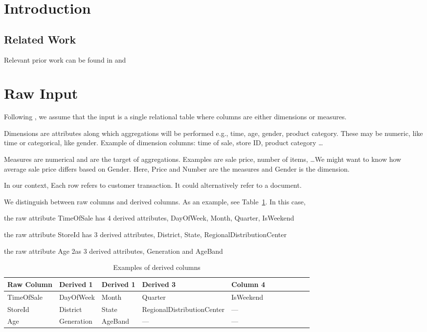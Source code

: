 
\section{Introduction}

\subsection{Related Work}
Relevant prior work can be found in \cite{sarawagi99}
and \cite{Fagin05}
\section{Raw Input}
Following \cite{Fagin05}, we assume that the input is a 
single relational table where columns are either dimensions or measures. 

Dimensions are
attributes along which aggregations will be performed e.g., time, age,
gender, product category. These may be numeric, like time or
categorical, like gender.
Example of dimension columns: time of sale, store ID, product category \ldots

Measures are numerical and are the target of aggregations. Examples are sale
price, number of items, \ldots We might want to know how average sale price
differs based on Gender. Here, Price and Number are the measures and Gender is
the dimension.

In our context, Each row refers to customer transaction. It could alternatively
refer to a document. 

We distinguish between raw columns and derived columns. As an example, see
Table~\ref{derived_columns}. In this case, 
\be
\item the raw attribute TimeOfSale
has 4 derived attributes, DayOfWeek, Month, Quarter, IsWeekend
\item the raw attribute StoreId
has 3 derived attributes, District, State, RegionalDistributionCenter
\item the raw attribute Age
2as 3 derived attributes, Generation and AgeBand
\item 
\ee

\begin{table}[hbtp]
\centering
\begin{tabular}{|l|l|l|l|l|l|l|l|l|l|l|} \hline \hline
Raw Column & Derived 1 & Derived 1 & Derived 3 & Column 4 \\ \hline
\hline
TimeOfSale & DayOfWeek & Month & Quarter & IsWeekend \\ \hline
StoreId     & District & State & RegionalDistributionCenter & --- \\ \hline
Age          & Generation & AgeBand & --- & --- \\ \hline
\end{tabular}
\caption{Examples of derived columns}
\label{derived_columns}
\end{table}

